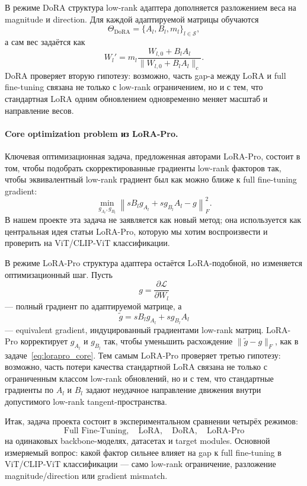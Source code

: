 \documentclass[]{scrartcl}
\begin{document}
В режиме DoRA структура low-rank адаптера дополняется разложением веса на magnitude и direction. Для каждой адаптируемой матрицы обучаются
\[
    \Theta_{\mathrm{DoRA}}=\{A_l,B_l,m_l\}_{l\in\mathcal{S}},
\]
а сам вес задаётся как
\[
    W_l'
    =
    m_l\frac{W_{l,0}+B_lA_l}{\|W_{l,0}+B_lA_l\|_c}.
\]
DoRA проверяет вторую гипотезу: возможно, часть gap-а между LoRA и full fine-tuning связана не только с low-rank ограничением, но и с тем, что стандартная LoRA одним обновлением одновременно меняет масштаб и направление весов.

\paragraph{Core optimization problem из LoRA-Pro.}
Ключевая оптимизационная задача, предложенная авторами LoRA-Pro, состоит в том, чтобы подобрать скорректированные градиенты low-rank факторов так, чтобы эквивалентный low-rank градиент был как можно ближе к full fine-tuning gradient:
\begin{equation}
    \min_{g_{A_l},g_{B_l}}
    \left\|sB_lg_{A_l}+sg_{B_l}A_l-g\right\|_F^2.
    \label{eq:lorapro_core}
\end{equation}
В нашем проекте эта задача не заявляется как новый метод; она используется как центральная идея статьи LoRA-Pro, которую мы хотим воспроизвести и проверить на ViT/CLIP-ViT классификации.

В режиме LoRA-Pro структура адаптера остаётся LoRA-подобной, но изменяется оптимизационный шаг. Пусть
\[
    g=\frac{\partial \mathcal{L}}{\partial W_l}
\]
--- полный градиент по адаптируемой матрице, а
\[
    \widetilde{g}=sB_lg_{A_l}+sg_{B_l}A_l
\]
--- equivalent gradient, индуцированный градиентами low-rank матриц. LoRA-Pro корректирует $g_{A_l}$ и $g_{B_l}$ так, чтобы уменьшить расхождение $\|\widetilde{g}-g\|_F$, как в задаче~\eqref{eq:lorapro_core}.
Тем самым LoRA-Pro проверяет третью гипотезу: возможно, часть потери качества стандартной LoRA связана не только с ограниченным классом low-rank обновлений, но и с тем, что стандартные градиенты по $A_l$ и $B_l$ задают неудачное направление движения внутри допустимого low-rank tangent-пространства.

Итак, задача проекта состоит в экспериментальном сравнении четырёх режимов:
\[
    \text{Full Fine-Tuning},\quad
    \text{LoRA},\quad
    \text{DoRA},\quad
    \text{LoRA-Pro}
\]
на одинаковых backbone-моделях, датасетах и target modules. Основной измеряемый вопрос: какой фактор сильнее влияет на gap к full fine-tuning в ViT/CLIP-ViT классификации --- само low-rank ограничение, разложение magnitude/direction или gradient mismatch.
\end{document}
